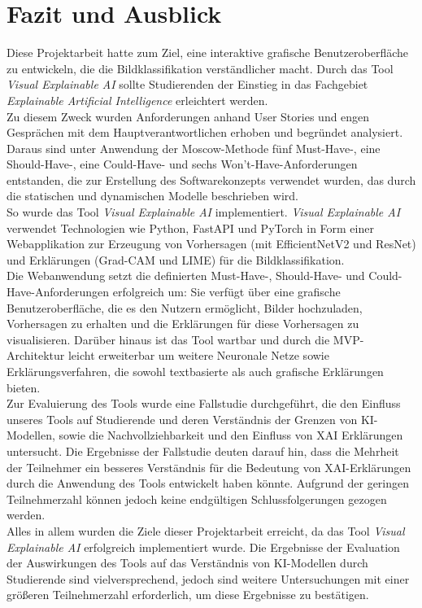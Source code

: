 \chapter{Fazit und Ausblick}
\label{chap:chapter-8}

Diese Projektarbeit hatte zum Ziel, eine interaktive grafische Benutzeroberfläche zu entwickeln, die die Bildklassifikation verständlicher macht. Durch das Tool \textit{Visual Explainable AI} sollte Studierenden der Einstieg in das Fachgebiet \textit{Explainable Artificial Intelligence} erleichtert werden.\\

Zu diesem Zweck wurden Anforderungen anhand User Stories und engen Gesprächen mit dem Hauptverantwortlichen erhoben und begründet analysiert. Daraus sind unter Anwendung der Moscow-Methode fünf Must-Have-, eine Should-Have-, eine Could-Have- und sechs Won't-Have-Anforderungen entstanden, die zur Erstellung des Softwarekonzepts verwendet wurden, das durch die statischen und dynamischen Modelle beschrieben wird.\\

So wurde das Tool \textit{Visual Explainable AI} implementiert. \textit{Visual Explainable AI} verwendet Technologien wie Python, FastAPI und PyTorch in Form einer Webapplikation zur Erzeugung von Vorhersagen (mit EfficientNetV2 und ResNet) und Erklärungen (Grad-CAM und LIME) für die Bildklassifikation.  \\

Die Webanwendung setzt die definierten Must-Have-, Should-Have- und Could-Have-Anforderungen erfolgreich um: Sie verfügt über eine grafische Benutzeroberfläche, die es den Nutzern ermöglicht, Bilder hochzuladen, Vorhersagen zu erhalten und die Erklärungen für diese Vorhersagen zu visualisieren. Darüber hinaus ist das Tool wartbar und durch die MVP-Architektur leicht erweiterbar um weitere Neuronale Netze sowie Erklärungsverfahren, die sowohl textbasierte als auch grafische Erklärungen bieten.\\

Zur Evaluierung des Tools wurde eine Fallstudie durchgeführt, die den Einfluss unseres Tools auf Studierende und deren Verständnis der Grenzen von KI-Modellen, sowie die Nachvollziehbarkeit und den Einfluss von XAI Erklärungen untersucht. Die Ergebnisse der Fallstudie deuten darauf hin, dass die Mehrheit der Teilnehmer ein besseres Verständnis für die Bedeutung von XAI-Erklärungen durch die Anwendung des Tools entwickelt haben könnte. Aufgrund der geringen Teilnehmerzahl können jedoch keine endgültigen Schlussfolgerungen gezogen werden. \\

Alles in allem wurden die Ziele dieser Projektarbeit erreicht, da das Tool \textit{Visual Explainable AI} erfolgreich implementiert wurde. Die Ergebnisse der Evaluation der Auswirkungen des Tools auf das Verständnis von KI-Modellen durch Studierende sind vielversprechend, jedoch sind weitere Untersuchungen mit einer größeren Teilnehmerzahl erforderlich, um diese Ergebnisse zu bestätigen.\\